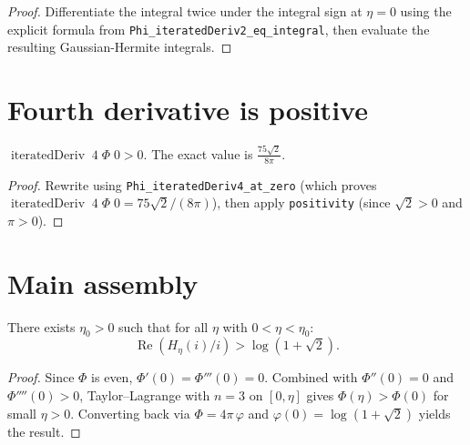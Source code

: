 \begin{proof}
  \leanok
  Differentiate the integral twice under the integral sign at $\eta = 0$
  using the explicit formula from \texttt{Phi\_iteratedDeriv2\_eq\_integral},
  then evaluate the resulting Gaussian-Hermite integrals.
\end{proof}

\section{Fourth derivative is positive}

\begin{lemma}[$\Phi''''(0) > 0$]
  \label{lem:Phi_fourth_deriv}
  \leanok
  $\operatorname{iteratedDeriv}\;4\;\Phi\;0 > 0$.
  The exact value is $\frac{75\sqrt{2}}{8\pi}$.
\end{lemma}

\begin{proof}
  \leanok
  Rewrite using \texttt{Phi\_iteratedDeriv4\_at\_zero} (which proves
  $\operatorname{iteratedDeriv}\;4\;\Phi\;0 = 75\sqrt{2}/(8\pi)$),
  then apply \texttt{positivity} (since $\sqrt{2} > 0$ and $\pi > 0$).
\end{proof}

\section{Main assembly}

\begin{theorem}[Theorem 4.4]
  \label{thm:4_4}
  \leanok
  There exists $\eta_0 > 0$ such that for all $\eta$ with $0 < \eta < \eta_0$:
  \[
    \operatorname{Re}(H_\eta(i)/i) > \log(1 + \sqrt{2}).
  \]
\end{theorem}

\begin{proof}
  \leanok
  Since $\Phi$ is even, $\Phi'(0) = \Phi'''(0) = 0$.
  Combined with $\Phi''(0) = 0$ and $\Phi''''(0) > 0$, Taylor--Lagrange with $n = 3$
  on $[0, \eta]$ gives $\Phi(\eta) > \Phi(0)$ for small $\eta > 0$.
  Converting back via $\Phi = 4\pi\,\varphi$ and $\varphi(0) = \log(1+\sqrt{2})$
  yields the result.
\end{proof}

